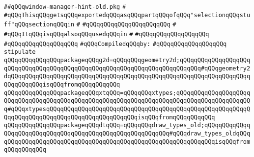 \label{src/lib/x-kit/xclient/src/iccc/window-manager-hint-old.pkg}
\verb|##qQQqwindow-manager-hint-old.pkg|\newline
\verb|#|\newline
\verb|#qQQqThisqQQqgetsqQQqexportedqQQqasqQQqpartqQQqofqQQq"selectionqQQqstuff"qQQqsectionqQQqin|\newline
\verb|#|\newline
\verb|#qQQqqQQqqQQqqQQqqQQq|\verb|qQQq|\newline
\verb|#|\newline
\verb|#qQQqItqQQqisqQQqalsoqQQqusedqQQqin|\newline
\verb|#|\newline
\verb|#qQQqqQQqqQQqqQQqqQQq|\newline
\verb|#qQQqqQQqqQQqqQQqqQQq|\newline
\newline
\verb|#qQQqCompiledqQQqby:|\newline
\verb|#qQQqqQQqqQQqqQQqqQQq|\newline
\newline
\verb|stipulate|\newline
\verb|qQQqqQQqqQQqqQQqpackageqQQqg2d=qQQqqQQqgeometry2d;qQQqqQQqqQQqqQQqqQQqqQQqqQQqqQQqqQQqqQQqqQQqqQQqqQQqqQQqqQQqqQQqqQQqqQQqqQQq#qQQqgeometry2dqQQqqQQqqQQqqQQqqQQqqQQqqQQqqQQqqQQqqQQqqQQqqQQqqQQqqQQqqQQqqQQqqQQqqQQqqQQqqQQqisqQQqfromqQQqqQQqqQQq|\newline
\verb|qQQqqQQqqQQqqQQqpackageqQQqxtqQQq=qQQqqQQqxtypes;qQQqqQQqqQQqqQQqqQQqqQQqqQQqqQQqqQQqqQQqqQQqqQQqqQQqqQQqqQQqqQQqqQQqqQQqqQQqqQQqqQQqqQQqqQQq#qQQqxtypesqQQqqQQqqQQqqQQqqQQqqQQqqQQqqQQqqQQqqQQqqQQqqQQqqQQqqQQqqQQqqQQqqQQqqQQqqQQqqQQqqQQqqQQqqQQqqQQqisqQQqfromqQQqqQQqqQQq|\newline
\verb|qQQqqQQqqQQqqQQqpackageqQQqdtqQQq=qQQqqQQqdraw_types_old;qQQqqQQqqQQqqQQqqQQqqQQqqQQqqQQqqQQqqQQqqQQqqQQqqQQqqQQqqQQq#qQQqdraw_types_oldqQQqqQQqqQQqqQQqqQQqqQQqqQQqqQQqqQQqqQQqqQQqqQQqqQQqqQQqqQQqqQQqisqQQqfromqQQqqQQqqQQq|\newline
